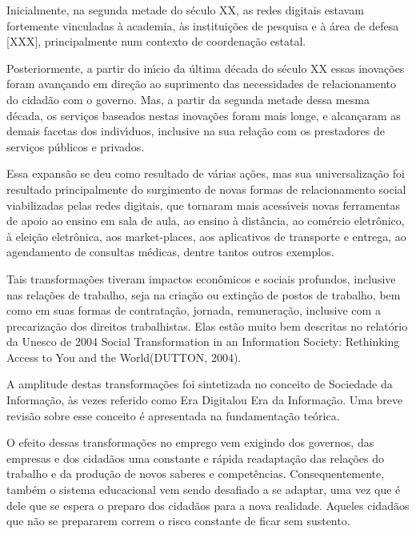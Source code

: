 \documentclass[
12pt,		%
openright,	%
twoside,  %
a4paper,			%
chapter=TITLE,		%
english,			%
french,				%
spanish,			%
brazil				%
]{USPSC-classe/USPSC}
\begin{document}
Inicialmente, na segunda metade do s\'eculo XX, as redes digitais estavam fortemente vinculadas \`a academia, \`as institui\c{c}\~oes de pesquisa e \`a \'area de defesa [XXX], principalmente num contexto de coordena\c{c}\~ao estatal.


Posteriormente, a partir do in\'{\i}cio da \'ultima d\'ecada do s\'eculo XX essas inova\c{c}\~oes  foram avan\c{c}ando em dire\c{c}\~ao ao suprimento das necessidades de relacionamento do cidad\~ao com o governo. Mas, a partir da segunda metade dessa mesma d\'ecada, os servi\c{c}os baseados nestas inova\c{c}\~oes foram mais longe, e alcan\c{c}aram  as demais facetas dos indiv\'{\i}duos, inclusive na sua rela\c{c}\~ao com os prestadores de servi\c{c}os p\'ublicos e privados.


Essa expans\~ao se deu como resultado de v\'arias a\c{c}\~oes, mas sua universaliza\c{c}\~ao foi resultado principalmente do surgimento de novas formas de relacionamento social viabilizadas pelas redes digitais, que tornaram mais acess\'{\i}veis novas ferramentas de apoio ao ensino em sala de aula, ao ensino \`a dist\^ancia, ao com\'ercio eletr\^onico, \`a elei\c{c}\~ao eletr\^onica, aos \textquotedbl market-places\textquotedbl , aos aplicativos de transporte e entrega, ao agendamento de consultas m\'edicas, dentre tantos outros exemplos.


Tais transforma\c{c}\~oes tiveram impactos econ\^omicos e sociais profundos, inclusive nas rela\c{c}\~oes de trabalho, seja na cria\c{c}\~ao ou extin\c{c}\~ao de postos de trabalho, bem como em suas formas de contrata\c{c}\~ao, jornada, remunera\c{c}\~ao, inclusive com a precariza\c{c}\~ao dos direitos trabalhistas. Elas est\~ao muito bem descritas  no relat\'orio da Unesco  de 2004 \textquotedbl Social Transformation in an Information Society: Rethinking Access to You and the World\textquotedbl  (DUTTON, 2004).


A amplitude destas transforma\c{c}\~oes foi sintetizada no conceito de \textquotedbl Sociedade da Informa\c{c}\~ao\textquotedbl , \`as vezes referido como \textquotedbl Era Digital\textquotedbl  ou \textquotedbl Era da Informa\c{c}\~ao\textquotedbl . Uma breve revis\~ao sobre esse conceito \'e apresentada na fundamenta\c{c}\~ao te\'orica.


O efeito dessas transforma\c{c}\~oes no emprego vem exigindo dos governos, das empresas e dos cidad\~aos uma constante e r\'apida readapta\c{c}\~ao  das rela\c{c}\~oes do trabalho e da produ\c{c}\~ao de novos saberes e compet\^encias. Consequentemente, tamb\'em o sistema educacional vem sendo desafiado a se adaptar, uma vez que \'e dele que se espera o preparo dos cidad\~aos para a nova realidade. Aqueles cidad\~aos que n\~ao se prepararem correm o risco constante de ficar sem sustento.
\end{document}
